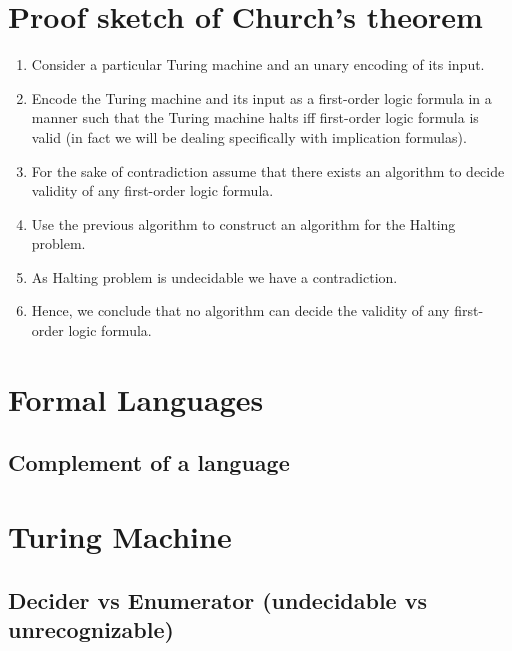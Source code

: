 \documentclass[
11pt,notheorems,hyperref={pdfauthor=whatever}
]{beamer}
\begin{document}
\section{Proof sketch of Church's theorem}
\begin{frame}
    \begin{enumerate}
        \item Consider a particular Turing machine and an unary encoding of its input.
        \item Encode the Turing machine and its input as a first-order logic formula in a manner such that the Turing machine halts iff first-order logic formula is valid (in fact we will be dealing specifically with implication formulas).
        \item For the sake of contradiction assume that there exists an algorithm to decide validity of any first-order logic formula.
        \item Use the previous algorithm to construct an algorithm for the Halting problem.
        \item As Halting problem is undecidable we have a contradiction.
        \item Hence, we conclude that no algorithm can decide the validity of any first-order logic formula.
    \end{enumerate}
\end{frame}


\section{Formal Languages}
\begin{frame}
\end{frame}

\subsection{Complement of a language}
\begin{frame}
\end{frame}

\section{Turing Machine}
\begin{frame}
\end{frame}

\subsection{Decider vs Enumerator (undecidable vs unrecognizable)}
\begin{frame}
\end{frame}
\end{document}
